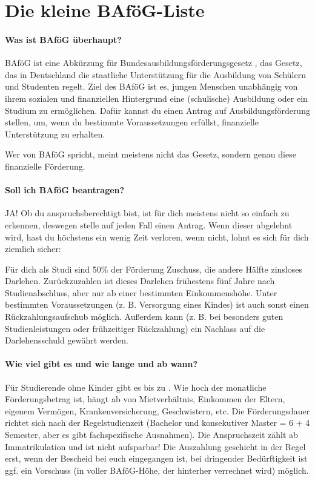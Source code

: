 \section{Die kleine BAföG-Liste}

\paragraph{Was ist BAföG überhaupt?}
BAföG ist eine Abkürzung für \glqq Bundesausbildungsförderungsgesetz \grqq, das Gesetz, das in Deutschland die staatliche Unterstützung für die Ausbildung von Schülern und Studenten regelt. Ziel des BAföG ist es, jungen Menschen unabhängig von ihrem sozialen und finanziellen Hintergrund eine (schulische) Ausbildung oder ein Studium zu ermöglichen. Dafür kannst du einen \glqq Antrag auf Ausbildungsförderung \grqq stellen, um, wenn du bestimmte Voraussetzungen erfüllst, finanzielle Unterstützung zu erhalten. 

Wer von BAföG spricht, meint meistens nicht das Gesetz, sondern genau diese finanzielle Förderung.

\paragraph{Soll ich BAföG beantragen?}
JA! Ob du anspruchsberechtigt bist, ist für dich meistens nicht so einfach zu erkennen, deswegen stelle auf jeden Fall einen Antrag. Wenn dieser abgelehnt wird, hast du höchstens ein wenig Zeit verloren, wenn nicht, lohnt es sich für dich ziemlich sicher:

Für dich als Studi sind 50\% der Förderung Zuschuss, die andere Hälfte zinsloses Darlehen. Zurückzuzahlen ist dieses Darlehen frühestens fünf Jahre nach Studienabschluss, aber nur ab einer bestimmten Einkommenshöhe. Unter bestimmten Voraussetzungen (z. B. Versorgung eines Kindes) ist auch sonst einen Rückzahlungsaufschub möglich. Außerdem kann (z. B. bei besonders guten Studienleistungen oder frühzeitiger Rückzahlung) ein Nachlass auf die Darlehensschuld gewährt werden.

\paragraph{Wie viel gibt es und wie lange und ab wann?}
Für Studierende ohne Kinder gibt es bis zu . Wie hoch der monatliche Förderungsbetrag ist, hängt ab von Mietverhältnis, Einkommen der Eltern, eigenem Vermögen, Krankenversicherung, Geschwistern, etc. Die Förderungsdauer richtet sich nach der Regelstudienzeit (Bachelor und konsekutiver Master = 6 + 4 Semester, aber es gibt fachspezifische Ausnahmen). Die Anspruchszeit zählt ab Immatrikulation und ist nicht aufsparbar! Die Auszahlung geschieht in der Regel erst, wenn der Bescheid bei euch eingegangen ist, bei dringender Bedürftigkeit ist ggf. ein Vorschuss (in voller BAföG-Höhe, der hinterher verrechnet wird) möglich.

